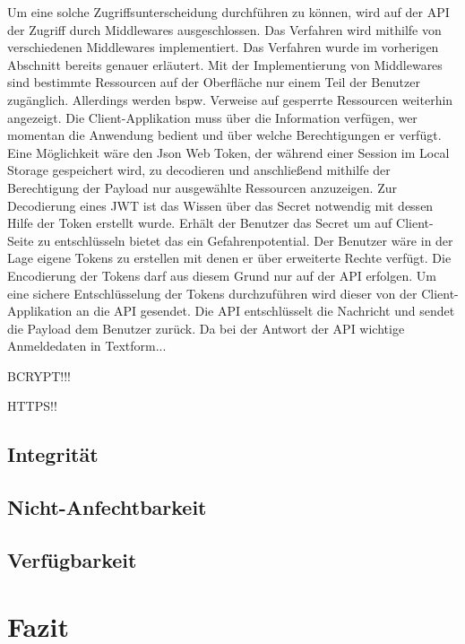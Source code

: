 \documentclass[utf8,biblatex]{lni}
\begin{document}
Um eine solche Zugriffsunterscheidung durchführen zu können, wird auf der API der Zugriff durch Middlewares ausgeschlossen. 
Das Verfahren wird mithilfe von verschiedenen Middlewares implementiert. Das Verfahren wurde im vorherigen Abschnitt 
bereits genauer erläutert. 
Mit der Implementierung von Middlewares sind bestimmte Ressourcen auf der Oberfläche nur einem Teil der Benutzer zugänglich. 
Allerdings werden bspw. Verweise auf gesperrte Ressourcen weiterhin angezeigt. 
Die Client-Applikation muss über die Information verfügen, wer momentan die Anwendung bedient und über welche Berechtigungen er verfügt. 
Eine Möglichkeit wäre den Json Web Token, der während einer Session im Local Storage gespeichert wird, zu decodieren und anschließend 
mithilfe der Berechtigung der Payload nur ausgewählte Ressourcen anzuzeigen. 
Zur Decodierung eines JWT ist das Wissen über das Secret notwendig mit dessen Hilfe der Token erstellt wurde. 
Erhält der Benutzer das Secret um auf Client-Seite zu entschlüsseln bietet das ein Gefahrenpotential. 
Der Benutzer wäre in der Lage eigene Tokens zu erstellen mit denen er über erweiterte Rechte verfügt. 
Die Encodierung der Tokens darf aus diesem Grund nur auf der API erfolgen. 
Um eine sichere Entschlüsselung der Tokens durchzuführen wird dieser von der Client-Applikation an die API 
gesendet. Die API entschlüsselt die Nachricht und sendet die Payload dem Benutzer zurück. 
Da bei der Antwort der API wichtige Anmeldedaten in Textform...

BCRYPT!!!

HTTPS!!


\subsection{Integrität}
\subsection{Nicht-Anfechtbarkeit}
\subsection{Verfügbarkeit}

\section{Fazit}


\printbibliography
\end{document}
